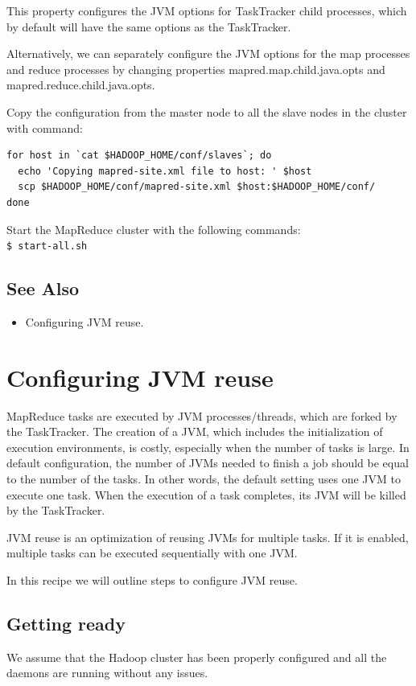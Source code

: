 This property configures the JVM options for TaskTracker child processes, which by default will have the same options as the TaskTracker.

Alternatively, we can separately configure the JVM options for the map processes and reduce processes by changing properties mapred.map.child.java.opts and mapred.reduce.child.java.opts.


Copy the configuration from the master node to all the slave nodes in the cluster with command:
\lstset{style=bashstyle}
\begin{lstlisting}
for host in `cat $HADOOP_HOME/conf/slaves`; do
  echo 'Copying mapred-site.xml file to host: ' $host
  scp $HADOOP_HOME/conf/mapred-site.xml $host:$HADOOP_HOME/conf/
done
\end{lstlisting}


Start the MapReduce cluster with the following commands: \\
\verb|$ start-all.sh|

\subsection*{See Also}
\begin{itemize}
  \item Configuring JVM reuse.
\end{itemize}
\section{Configuring JVM reuse}
MapReduce tasks are executed by JVM processes/threads, which are forked by the TaskTracker. The creation of a JVM, which includes the initialization of execution environments, is costly, especially when the number of tasks is large. In default configuration, the number of JVMs needed to finish a job should be equal to the number of the tasks. In other words, the default setting uses one JVM to execute one task. When the execution of a task completes, its JVM will be killed by the TaskTracker.

JVM reuse is an optimization of reusing JVMs for multiple tasks. If it is enabled, multiple tasks can be executed sequentially with one JVM.

In this recipe we will outline steps to configure JVM reuse.
\subsection*{Getting ready}
We assume that the Hadoop cluster has been properly configured and all the daemons are running without any issues.

